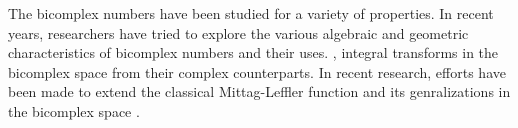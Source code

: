 \documentclass[a4paper,12pt]{article}
\theoremstyle{remark}
\begin{document}
\noindent %
The bicomplex numbers have been studied for a variety of properties. In recent years, researchers have tried to explore the various algebraic and geometric characteristics of bicomplex numbers and their uses.
\cite{  rochon2004b, ronn2001, meluna2012},
integral transforms \cite{ ragarwal2014a,ragarwal2017}
in the bicomplex space from their complex counterparts. In recent research, efforts have been made to extend  the classical Mittag-Leffler function and its genralizations  in the bicomplex space \cite{agarwal2023bicomplex,ragarwal2022,ragarwal2021sept,ragarwal2023solution,bakhet2025new,bakhet2025bicomplex}. %





\end{document}
